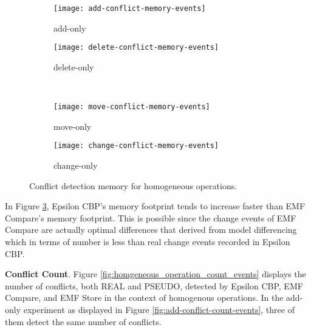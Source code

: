 \begin{figure*}[ht]
  \centering
  \begin{subfigure}[t]{0.495\linewidth}
    \texttt{[image: add-conflict-memory-events]}
    \caption{add-only}
    \label{fig:add-conflict-memory-events}
  \end{subfigure}
  \hfill
  \begin{subfigure}[t]{0.495\linewidth}
    \texttt{[image: delete-conflict-memory-events]}
    \caption{delete-only}
    \label{fig:delete-conflict-memory-events}
  \end{subfigure}
  \\
  \begin{subfigure}[t]{0.495\linewidth}
    \texttt{[image: move-conflict-memory-events]}
    \caption{move-only}
    \label{fig:move-conflict-memory-events}
  \end{subfigure}
  \hfill
  \begin{subfigure}[t]{0.495\linewidth}
    \texttt{[image: change-conflict-memory-events]}
    \caption{change-only}
    \label{fig:change-conflict-memory-events}
  \end{subfigure}
  \caption{Conflict detection memory for homogeneous operations.}
  \label{fig:homgeneous_operation_memory_events}
\end{figure*}

In Figure \ref{fig:move-conflict-memory-events}, Epsilon CBP's memory footprint tends to increase faster than EMF Compare's memory footprint. This is possible since the change events of EMF Compare are actually optimal differences that derived from model differencing which in terms of number is less than real change events recorded in Epsilon CBP. 

\textbf{Conflict Count}. Figure \ref{fig:homgeneous_operation_count_events} displays the number of conflicts, both \textsf{REAL} and \textsf{PSEUDO}, detected by Epsilon CBP, EMF Compare, and EMF Store in the context of homogenous operations. In the add-only experiment as displayed in Figure \ref{fig:add-conflict-count-events}, three of them detect the same number of conflicts.

